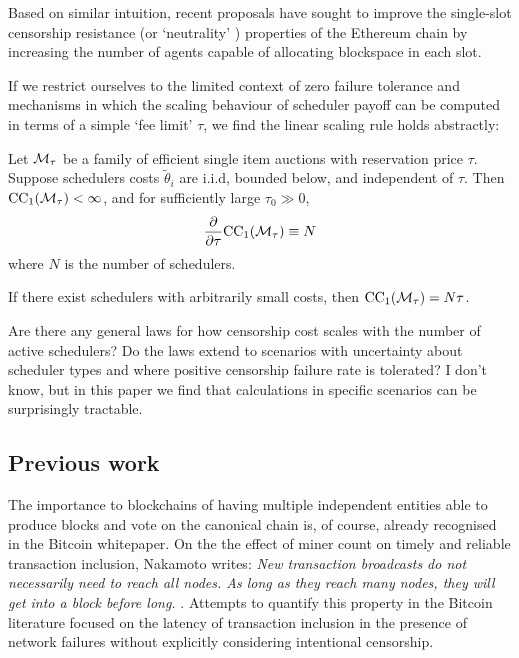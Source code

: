 Based on similar intuition, recent proposals \cite{FPR,thomas2024forkchoice} have sought to improve the single-slot censorship resistance (or `neutrality' \cite{ma2024uncrowdable}) properties of the Ethereum chain by increasing the number of agents capable of allocating blockspace in each slot.

If we restrict ourselves to the limited context of zero failure tolerance and mechanisms in which the scaling behaviour of scheduler payoff can be computed in terms of a simple `fee limit' $\tau$, we find the linear scaling rule holds abstractly:

\begin{theorem}
  \label{thm:product-law}

  Let $\mathcal{M}_\tau$ be a family of efficient single item auctions with reservation price $\tau$.
  Suppose schedulers costs $\tilde\theta_i$ are i.i.d, bounded below, and independent of $\tau$.
  Then $\mathrm{CC}_{1}(\mathcal{M}_\tau)<\infty$, and for sufficiently large $\tau_0\gg 0$,
  \[
    \frac{\partial}{\partial\tau}\mathrm{CC}_{1}(\mathcal{M}_\tau) \equiv N
  \]
  where $N$ is the number of schedulers.

  If there exist schedulers with arbitrarily small costs, then $\mathrm{CC}_{1}(\mathcal{M}_\tau) = N\tau$.
  
\end{theorem}

Are there any general laws for how censorship cost scales with the number of active schedulers?
%
Do the laws extend to scenarios with uncertainty about scheduler types and where positive censorship failure rate is tolerated?
%
I don't know, but in this paper we find that calculations in specific scenarios can be surprisingly tractable.

\subsection{Previous work}

The importance to blockchains of having multiple independent entities able to produce blocks and vote on the canonical chain is, of course, already recognised in the Bitcoin whitepaper.
%
On the the effect of miner count on timely and reliable transaction inclusion, Nakamoto writes: \emph{New transaction broadcasts do not necessarily need to reach all nodes. As long as they reach many nodes, they will get into a block before long.} \cite[\S5]{nakamoto2008bitcoin}.
%
Attempts to quantify this property in the Bitcoin literature focused on the latency of transaction inclusion in the presence of network failures \cite{pappalardo2018blockchain} without explicitly considering intentional censorship.


